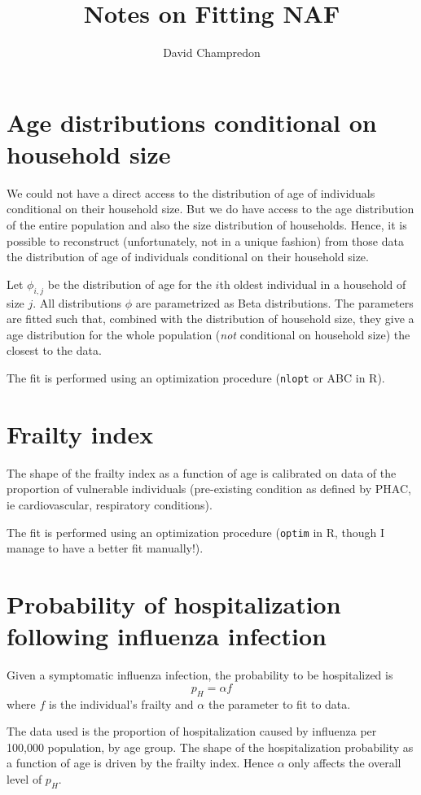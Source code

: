 \documentclass[10pt,twocolumn]{article}
\title{Notes on Fitting NAF}
\author{David Champredon}
\begin{document}
\maketitle


\section{Age distributions conditional on household size}

We could not have a direct access to the distribution of age of individuals conditional on their household size. But we do have access to the age distribution of the entire population and also the size distribution of households. 
Hence, it is possible to reconstruct (unfortunately, not in a unique fashion) from those data the distribution of age of individuals conditional on their household size.


Let $\phi_{i,j}$ be the distribution of age for the $i$th oldest individual in a household of size $j$. All distributions $\phi$ are parametrized as Beta distributions. The parameters are fitted such that, combined with the distribution of household size, they give a age distribution for the whole population (\emph{not} conditional on household size) the closest to the data.

The fit is performed using an optimization procedure (\texttt{nlopt} or ABC in R).

\section{Frailty index}

The shape of the frailty index as a function of age is calibrated on data of the proportion of vulnerable individuals (pre-existing condition as defined by PHAC, ie cardiovascular, respiratory conditions).

The fit is performed using an optimization procedure (\texttt{optim} in R, though I manage to have a better fit manually!).


\section{Probability of hospitalization following influenza infection}

Given a symptomatic influenza infection, the probability to be hospitalized is 
$$p_H = \alpha f $$
where $f$ is the individual's frailty and $\alpha$ the parameter to fit to data. 

The data used is the proportion of hospitalization caused by influenza per 100,000 population, by age group. The shape of the hospitalization probability as a function of age is driven by the frailty index. Hence $\alpha$ only affects the overall level of $p_H$.
\end{document}
